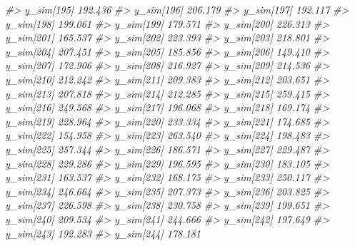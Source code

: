 \documentclass[
  10pt,
  italian,
  a4paper,
  extrafontsizes,onecolumn,openright
  ]{memoir}
\newenvironment{Shaded}{\begin{snugshade}}{\end{snugshade}}
\newcommand{\CommentTok}[1]{\textcolor[rgb]{0.56,0.35,0.01}{\textit{#1}}}
\begin{document}
\begin{Shaded}
\begin{Highlighting}[]
\CommentTok{\#\textgreater{}   y\_sim[195] 192.436}
\CommentTok{\#\textgreater{}   y\_sim[196] 206.179}
\CommentTok{\#\textgreater{}   y\_sim[197] 192.117}
\CommentTok{\#\textgreater{}   y\_sim[198] 199.061}
\CommentTok{\#\textgreater{}   y\_sim[199] 179.571}
\CommentTok{\#\textgreater{}   y\_sim[200] 226.313}
\CommentTok{\#\textgreater{}   y\_sim[201] 165.537}
\CommentTok{\#\textgreater{}   y\_sim[202] 223.393}
\CommentTok{\#\textgreater{}   y\_sim[203] 218.801}
\CommentTok{\#\textgreater{}   y\_sim[204] 207.451}
\CommentTok{\#\textgreater{}   y\_sim[205] 185.856}
\CommentTok{\#\textgreater{}   y\_sim[206] 149.410}
\CommentTok{\#\textgreater{}   y\_sim[207] 172.906}
\CommentTok{\#\textgreater{}   y\_sim[208] 216.927}
\CommentTok{\#\textgreater{}   y\_sim[209] 214.536}
\CommentTok{\#\textgreater{}   y\_sim[210] 212.242}
\CommentTok{\#\textgreater{}   y\_sim[211] 209.383}
\CommentTok{\#\textgreater{}   y\_sim[212] 203.651}
\CommentTok{\#\textgreater{}   y\_sim[213] 207.818}
\CommentTok{\#\textgreater{}   y\_sim[214] 212.285}
\CommentTok{\#\textgreater{}   y\_sim[215] 259.415}
\CommentTok{\#\textgreater{}   y\_sim[216] 249.568}
\CommentTok{\#\textgreater{}   y\_sim[217] 196.068}
\CommentTok{\#\textgreater{}   y\_sim[218] 169.174}
\CommentTok{\#\textgreater{}   y\_sim[219] 228.964}
\CommentTok{\#\textgreater{}   y\_sim[220] 233.334}
\CommentTok{\#\textgreater{}   y\_sim[221] 174.685}
\CommentTok{\#\textgreater{}   y\_sim[222] 154.958}
\CommentTok{\#\textgreater{}   y\_sim[223] 263.540}
\CommentTok{\#\textgreater{}   y\_sim[224] 198.483}
\CommentTok{\#\textgreater{}   y\_sim[225] 257.344}
\CommentTok{\#\textgreater{}   y\_sim[226] 186.571}
\CommentTok{\#\textgreater{}   y\_sim[227] 229.487}
\CommentTok{\#\textgreater{}   y\_sim[228] 229.286}
\CommentTok{\#\textgreater{}   y\_sim[229] 196.595}
\CommentTok{\#\textgreater{}   y\_sim[230] 183.105}
\CommentTok{\#\textgreater{}   y\_sim[231] 163.537}
\CommentTok{\#\textgreater{}   y\_sim[232] 168.175}
\CommentTok{\#\textgreater{}   y\_sim[233] 250.117}
\CommentTok{\#\textgreater{}   y\_sim[234] 246.664}
\CommentTok{\#\textgreater{}   y\_sim[235] 207.373}
\CommentTok{\#\textgreater{}   y\_sim[236] 203.825}
\CommentTok{\#\textgreater{}   y\_sim[237] 226.598}
\CommentTok{\#\textgreater{}   y\_sim[238] 230.758}
\CommentTok{\#\textgreater{}   y\_sim[239] 199.651}
\CommentTok{\#\textgreater{}   y\_sim[240] 209.534}
\CommentTok{\#\textgreater{}   y\_sim[241] 244.666}
\CommentTok{\#\textgreater{}   y\_sim[242] 197.649}
\CommentTok{\#\textgreater{}   y\_sim[243] 192.283}
\CommentTok{\#\textgreater{}   y\_sim[244] 178.181}

\end{Highlighting}
\end{Shaded}
\end{document}
